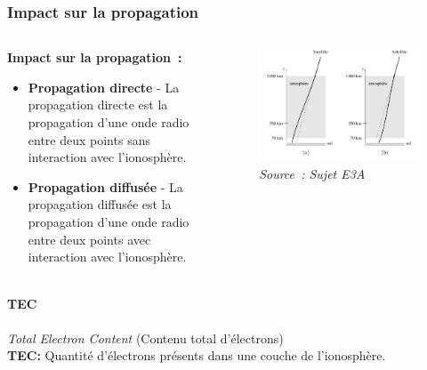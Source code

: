 \documentclass[xcolor=dvipsnames,envcountsect]{beamer}
\begin{document}
\begin{frame}
	\frametitle{Impact sur la propagation}
		\justifying
		\begin{columns}
			\begin{column}{0.5\textwidth}
				\textbf{Impact sur la propagation :} 
				\begin{itemize}
					\item \textbf{Propagation directe} - La propagation directe est la propagation d'une onde radio entre deux points sans interaction avec l'ionosphère.
					\item \textbf{Propagation diffusée} - La propagation diffusée est la propagation d'une onde radio entre deux points avec interaction avec l'ionosphère.
				\end{itemize}
			\end{column}
			\begin{column}{0.5\textwidth}
				\begin{figure}
					\centering
					\includegraphics[width=1\textwidth]{./Figures/iono_e3a.png}
					\caption {\textit{Source : Sujet E3A}}	
				\end{figure}
			\end{column}
	\end{columns}
\end{frame}
\begin{frame}
	\framesubtitle{TEC}
	\textit{Total Electron Content} (Contenu total d'électrons)\\
	\textbf{TEC:} Quantité d'électrons présents dans une couche de l'ionosphère.\\
	
\end{frame}
\end{document}
